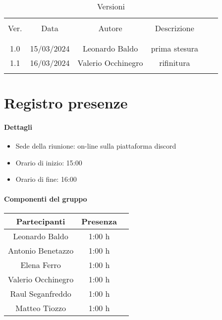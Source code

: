 \documentclass[italian,12pt]{article} %
\begin{document}


\newpage





\begin{table}[!h]
	\caption{Versioni}
	\begin{center}
		\begin{tabular}{ c c c c c c }
			\hline \\[-2ex]
			Ver. & Data & Autore & Descrizione \\
			\\[-2ex] \hline \\[-1.5ex]
			1.0 & 15/03/2024 & Leonardo Baldo& prima stesura \\
			1.1 & 16/03/2024 & Valerio Occhinegro& rifinitura  \\
			\\[-1.5ex] \hline
		\end{tabular}
	\end{center}
\end{table}
\newpage

\tableofcontents

\newpage

\section{Registro presenze}

\paragraph{Dettagli}

\begin{itemize}
	\item Sede della riunione: on-line sulla piattaforma discord
	\item Orario di inizio: 15:00
	\item Orario di fine: 16:00
\end{itemize}

\paragraph{Componenti del gruppo}

\begin{flushleft}
\begin{table}[!h]
\begin{tabular}{ |c|c|c| } 
	\hline
	Partecipanti & Presenza \\
	\hline 
	Leonardo Baldo 		 & 1:00 h \\ 
	Antonio Benetazzo 	 & 1:00 h \\
	Elena Ferro 		 & 1:00 h \\
	Valerio Occhinegro 	 & 1:00 h \\
	Raul Seganfreddo 	 & 1:00 h \\
	Matteo Tiozzo 		 & 1:00 h \\ 
	\hline
\end{tabular}
\end{table}
\end{flushleft}
\end{document}

